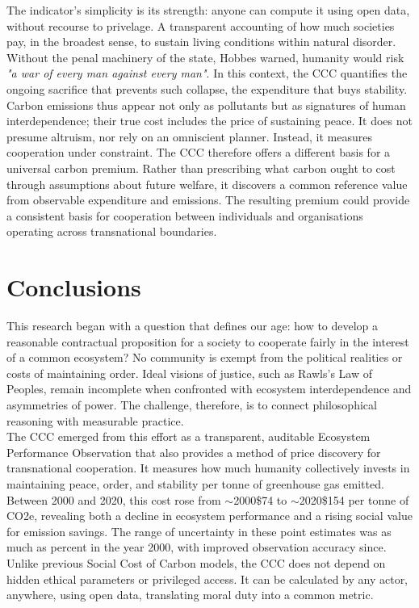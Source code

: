 \documentclass[10pt, oneside]{article}   	%
\begin{document}
The indicator’s simplicity is its strength: anyone can compute it using open data, without recourse to privelage.
A transparent accounting of how much societies pay, in the broadest sense, to sustain living conditions within natural disorder.
Without the penal machinery of the state, Hobbes warned, humanity would risk \emph{"a war of every man against every man"}.
In this context, the CCC quantifies the ongoing sacrifice that prevents such collapse, the expenditure that buys stability.
Carbon emissions thus appear not only as pollutants but as signatures of human interdependence; their true cost includes the price of sustaining peace.
It does not presume altruism, nor rely on an omniscient planner.
Instead, it measures cooperation under constraint.
The CCC therefore offers a different basis for a universal carbon premium.
Rather than prescribing what carbon ought to cost through assumptions about future welfare, it discovers a common reference value from observable expenditure and emissions.
The resulting premium could provide a consistent basis for cooperation between individuals and organisations operating across transnational boundaries.\\

\section{Conclusions}

This research began with a question that defines our age: how to develop a reasonable contractual proposition for a society to cooperate fairly in the interest of a common ecosystem?
No community is exempt from the political realities or costs of maintaining order.
Ideal visions of justice, such as Rawls’s Law of Peoples, remain incomplete when confronted with ecosystem interdependence and asymmetries of power.
The challenge, therefore, is to connect philosophical reasoning with measurable practice.\\

The CCC emerged from this effort as a transparent, auditable Ecosystem Performance Observation that also provides a method of price discovery for transnational cooperation.
It measures how much humanity collectively invests in maintaining peace, order, and stability per tonne of greenhouse gas emitted.
Between 2000 and 2020, this cost rose from $\sim$2000\$74 to $\sim$2020\$154 per tonne of CO2e, revealing both a decline in ecosystem performance and a rising social value for emission savings.
The range of uncertainty in these point estimates was as much as  percent in the year 2000, with improved observation accuracy since.
Unlike previous Social Cost of Carbon models, the CCC does not depend on hidden ethical parameters or privileged access.
It can be calculated by any actor, anywhere, using open data, translating moral duty into a common metric.\\

\pagebreak

 

\end{document}
